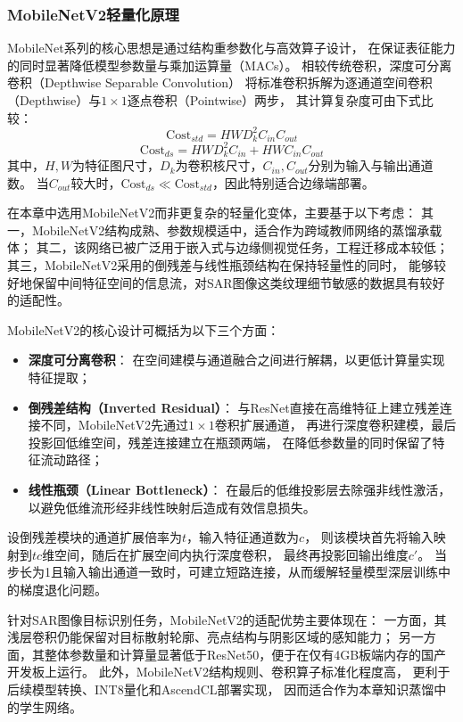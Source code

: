 \subsubsection{MobileNetV2轻量化原理}

MobileNet系列的核心思想是通过结构重参数化与高效算子设计，
在保证表征能力的同时显著降低模型参数量与乘加运算量（MACs）。
相较传统卷积，深度可分离卷积（Depthwise Separable Convolution）
将标准卷积拆解为逐通道空间卷积（Depthwise）与$1\times 1$逐点卷积（Pointwise）两步，
其计算复杂度可由下式比较：
\begin{equation}
\mathrm{Cost}_{std} = HWD_k^2C_{in}C_{out}
\end{equation}
\begin{equation}
\mathrm{Cost}_{ds} = HWD_k^2C_{in} + HWC_{in}C_{out}
\end{equation}
其中，$H,W$为特征图尺寸，$D_k$为卷积核尺寸，$C_{in},C_{out}$分别为输入与输出通道数。
当$C_{out}$较大时，$\mathrm{Cost}_{ds}\ll\mathrm{Cost}_{std}$，因此特别适合边缘端部署。

在本章中选用MobileNetV2而非更复杂的轻量化变体，主要基于以下考虑：
其一，MobileNetV2结构成熟、参数规模适中，适合作为跨域教师网络的蒸馏承载体；
其二，该网络已被广泛用于嵌入式与边缘侧视觉任务，工程迁移成本较低；
其三，MobileNetV2采用的倒残差与线性瓶颈结构在保持轻量性的同时，
能够较好地保留中间特征空间的信息流，对SAR图像这类纹理细节敏感的数据具有较好的适配性。

MobileNetV2的核心设计可概括为以下三个方面：
\begin{itemize}[nosep,leftmargin=*]
	\item \textbf{深度可分离卷积}：
	在空间建模与通道融合之间进行解耦，以更低计算量实现特征提取；
	\item \textbf{倒残差结构（Inverted Residual）}：
	与ResNet直接在高维特征上建立残差连接不同，MobileNetV2先通过$1\times 1$卷积扩展通道，
	再进行深度卷积建模，最后投影回低维空间，残差连接建立在瓶颈两端，
	在降低参数量的同时保留了特征流动路径；
	\item \textbf{线性瓶颈（Linear Bottleneck）}：
	在最后的低维投影层去除强非线性激活，
	以避免低维流形经非线性映射后造成有效信息损失。
\end{itemize}

设倒残差模块的通道扩展倍率为$t$，输入特征通道数为$c$，
则该模块首先将输入映射到$tc$维空间，随后在扩展空间内执行深度卷积，
最终再投影回输出维度$c'$。
当步长为1且输入输出通道一致时，可建立短路连接，从而缓解轻量模型深层训练中的梯度退化问题。

针对SAR图像目标识别任务，MobileNetV2的适配优势主要体现在：
一方面，其浅层卷积仍能保留对目标散射轮廓、亮点结构与阴影区域的感知能力；
另一方面，其整体参数量和计算量显著低于ResNet50，便于在仅有4GB板端内存的国产开发板上运行。
此外，MobileNetV2结构规则、卷积算子标准化程度高，
更利于后续模型转换、INT8量化和AscendCL部署实现，
因而适合作为本章知识蒸馏中的学生网络。

